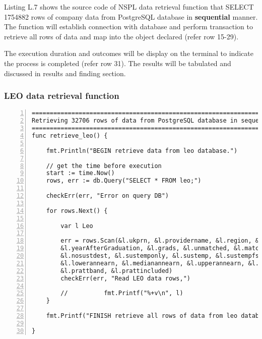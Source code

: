 Listing L.7 shows the source code of NSPL data retrieval function that SELECT 1754882 rows of company data from PostgreSQL database in \textbf{sequential} manner. The function will establish connection with database and perform transaction to retrieve all rows of data and map into the object declared (refer row 15-29). 

The execution duration and outcomes will be display on the terminal to indicate the process is completed (refer row 31). The results will be tabulated and discussed in results and finding section. 

\newpage 

\subsubsection{LEO data retrieval function}

\lstset{basicstyle=\ttfamily\tiny}  
\begin{lstlisting}[breaklines, frame=single, numbers=left, caption={Function for LEO data retrieval. (retrieve\_leo.go)}, label=commandline-02]
=============================================================================
Retrieving 32706 rows of data from PostgreSQL database in sequential manner
=============================================================================
func retrieve_leo() {

	fmt.Println("BEGIN retrieve data from leo database.")
	
	// get the time before execution
	start := time.Now()
	rows, err := db.Query("SELECT * FROM leo;")
	
	checkErr(err, "Error on query DB")	
	
	for rows.Next() {
	
		var l Leo
		
		err = rows.Scan(&l.ukprn, &l.providername, &l.region, &l.subject, &l.sex,
		&l.yearAfterGraduation, &l.grads, &l.unmatched, &l.matched, &l.activitynocaptured,
		&l.nosustdest, &l.sustemponly, &l.sustemp, &l.sustempfsorboth, &l.earningsinclude,
		&l.lowerannearn, &l.medianannearn, &l.upperannearn, &l.polargrpone, &l.polargrponeincluded,
		&l.prattband, &l.prattincluded)
		checkErr(err, "Read LEO data rows,")
		
		//			fmt.Printf("%+v\n", l)
	}
	
	fmt.Printf("FINISH retrieve all rows of data from leo database with %.5fs seconds. \n", time.Since(start).Seconds())

}

\end{lstlisting}


